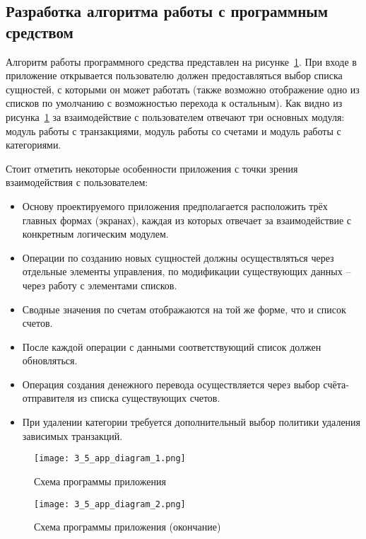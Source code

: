 \subsection{Разработка алгоритма работы с программным средством}
\label{sec:design:app}

Алгоритм работы программного средства представлен на рисунке~\ref{fig:design:app:diagram}.
При входе в приложение открывается пользователю должен предоставляться выбор списка сущностей, с которыми он может работать (также возможно отображение одно из списков по умолчанию с возможностью перехода к остальным).
Как видно из рисунка~\ref{fig:design:app:diagram} за взаимодействие с пользователем отвечают три основных модуля: модуль работы с транзакциями, модуль работы со счетами и модуль работы с категориями.

Стоит отметить некоторые особенности приложения с точки зрения взаимодействия с пользователем:
\begin{itemize}
    \item Основу проектируемого приложения предполагается расположить трёх главных формах (экранах), каждая из которых отвечает за взаимодействие с конкретным логическим модулем.
    \item Операции по созданию новых сущностей должны осуществляться через отдельные элементы управления, по модификации существующих данных -- через работу с элементами списков.
    \item Сводные значения по счетам отображаются на той же форме, что и список счетов.
    \item После каждой операции с данными соответствующий список должен обновляться.
    \item Операция создания денежного перевода осуществляется через выбор счёта-отправителя из списка существующих счетов.
    \item При удалении категории требуется дополнительный выбор политики удаления зависимых транзакций.
\end{itemize}

\begin{figure}[p]
    \centering
    \texttt{[image: 3\_5\_app\_diagram\_1.png]}
    \caption{Схема программы приложения}
    \label{fig:design:app:diagram}
\end{figure}

\begin{sidewaysfigure}
    \centering
    \ContinuedFloat
    \texttt{[image: 3\_5\_app\_diagram\_2.png]}
    \caption{Схема программы приложения (окончание)}
\end{sidewaysfigure}

